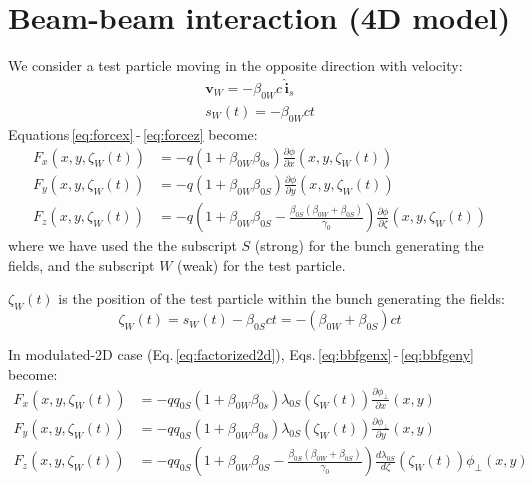 \section{Beam-beam interaction (4D model)}

We consider a test particle moving in the opposite direction with velocity:
\begin{align}
\textbf{v}_W = -\beta_{0W} c\, \hat{\textbf{i}}_s\\
s_W(t) = -\beta_{0W} ct
\end{align}
Equations\,\eqref{eq:forcex}\,-\,\eqref{eq:forcez} become:
\begin{align}
F_x(x, y, \zeta_W(t)) &=  -q(1+\beta_{0W}  \beta_{0s}) \frac{\partial \phi}{\partial x}(x, y, \zeta_W(t)) \label{eq:bbfgenx}\\
F_y(x, y, \zeta_W(t)) &=  -q(1+\beta_{0W}  \beta_{0S}) \frac{\partial \phi}{\partial y}(x, y, \zeta_W(t))\label{eq:bbfgeny}\\
F_z(x, y, \zeta_W(t)) &=  -q\left(1+\beta_{0W}  \beta_{0S} -\frac{\beta_{0S}(\beta_{0W}+\beta_{0S})}{\gamma_0}\right) \frac{\partial \phi}{\partial \zeta}(x, y, \zeta_W(t))\label{eq:bbfgenz}
\end{align}
where we have used the the subscript $S$ (strong) for the bunch generating the fields, and the subscript $W$ (weak) for the test particle. 

$\zeta_W(t)$ is the position of the test particle within the bunch generating the fields: 
\begin{equation}
\zeta_W(t)= s_W(t) -\beta_{0S} c t  = -(\beta_{0W}+\beta_{0S})ct
\label{eq:zetaw}
\end{equation}

In modulated-2D case (Eq.\,\ref{eq:factorized2d}), Eqs.\,\eqref{eq:bbfgenx}\,-\,\eqref{eq:bbfgeny} become:
\begin{align}
F_x(x, y, \zeta_W(t)) &=  -q q_{0S} (1+\beta_{0W}  \beta_{0s})
\lambda_{0S}(\zeta_W(t))
 \frac{\partial \phi_\perp}{\partial x}(x, y ) \\
F_y(x, y, \zeta_W(t)) &=  -qq_{0S}  (1+\beta_{0W}  \beta_{0s})
\lambda_{0S}(\zeta_W(t))
 \frac{\partial \phi_\perp}{\partial y}(x, y ) \\
F_z(x, y, \zeta_W(t)) &=  -qq_{0S}\left(1+\beta_{0W}  \beta_{0S} -\frac{\beta_{0S}(\beta_{0W}+\beta_{0S})}{\gamma_0}\right) \frac{d \lambda_{0S}}{d \zeta}(\zeta_W(t)) \phi_\perp(x, y)
\end{align}

